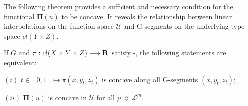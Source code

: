 The following theorem provides a sufficient and necessary condition for the functional $\pmb \Pi(u)$ to be concave. It reveals the relationship between linear interpolations on the function space $\mathcal{U}$ and G-segments on the underlying type space $cl( Y \times Z)$.\medskip

\begin{theorem}\label{maintheorem}
	If $G$ and $\pi: cl(X\times Y\times Z) \longrightarrow {\mathbf R}$ satisfy \Gzero-\Gfive, the following statements are equivalent:
	
	$(i)$ $t\in[0,1] \longmapsto \pi(x, y_t ,z_t)$ is concave along all G-segments $(x, y_t, z_t)$;
	
	$(ii)$ $\pmb \Pi(u)$ is concave in $\mathcal{U}$ for all $\mu\ll \mathcal{L}^m$. 
\end{theorem}

